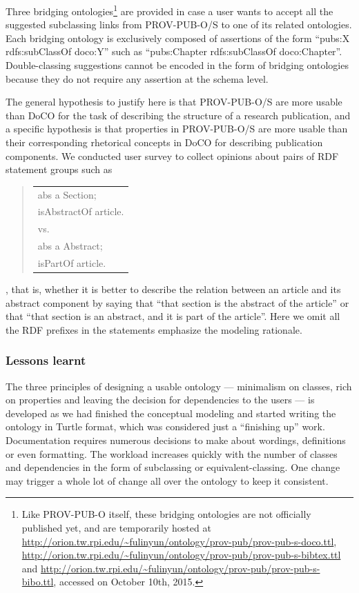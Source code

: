 Three bridging 
ontologies\footnote{Like PROV-PUB-O itself, these bridging ontologies are not officially published yet, and are temporarily hosted at \url{http://orion.tw.rpi.edu/~fulinyun/ontology/prov-pub/prov-pub-s-doco.ttl}, \url{http://orion.tw.rpi.edu/~fulinyun/ontology/prov-pub/prov-pub-s-bibtex.ttl} and 
\url{http://orion.tw.rpi.edu/~fulinyun/ontology/prov-pub/prov-pub-s-bibo.ttl}, accessed on October 10th, 2015.} are provided in case a user wants to accept all the suggested subclassing links from
PROV-PUB-O/S to one of its related ontologies. Each bridging ontology is exclusively composed of assertions of the form ``pubs:X rdfs:subClassOf doco:Y'' 
such as ``pubs:Chapter rdfs:subClassOf doco:Chapter''. Double-classing suggestions cannot be encoded in the form of bridging ontologies because they do 
not require any assertion at the schema level.

The general hypothesis to justify here is that PROV-PUB-O/S are more usable than DoCO for the task of describing the structure of a research publication, and a specific hypothesis is that properties in PROV-PUB-O/S are more usable than their corresponding rhetorical concepts in DoCO for describing publication components. We conducted user survey to collect opinions about pairs of RDF statement groups such as

\begin{quote}
	\begin{tabular}{l}
	abs a Section;\\
	 \hspace{1em}isAbstractOf article.\\
	 \hspace{3em}vs.\\
	abs a Abstract;\\ 
	 \hspace{1em}isPartOf article.
	\end{tabular}
\end{quote}

, that is, whether it is better to describe the relation between an article and its abstract component by saying that ``that section is the abstract of the article'' or that ``that section is an abstract, and it is part of the article''. Here we omit all the RDF prefixes in the statements emphasize the modeling rationale.

\subsubsection{Lessons learnt}
The three principles of designing a usable ontology --- minimalism on classes, rich on properties and leaving the decision for dependencies to the users --- is developed as we had finished the conceptual modeling and started writing the ontology in Turtle format, which was considered just a ``finishing up'' work. Documentation requires numerous decisions to make about wordings, definitions or even formatting. The workload increases quickly with the number of classes and dependencies in the form of subclassing or equivalent-classing. One change may trigger a whole lot of change all over the ontology to keep it consistent.

